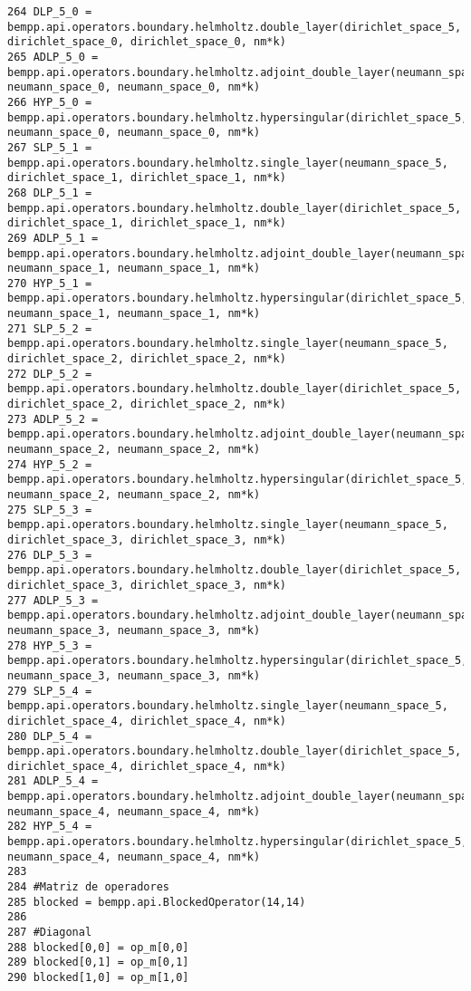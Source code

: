 \documentclass[12pt,letterpaper]{report}
\numberwithin{equation}{section}
\begin{document}
\begin{lstlisting}
264 DLP_5_0 = bempp.api.operators.boundary.helmholtz.double_layer(dirichlet_space_5, dirichlet_space_0, dirichlet_space_0, nm*k)
265 ADLP_5_0 = bempp.api.operators.boundary.helmholtz.adjoint_double_layer(neumann_space_5, neumann_space_0, neumann_space_0, nm*k)
266 HYP_5_0 = bempp.api.operators.boundary.helmholtz.hypersingular(dirichlet_space_5, neumann_space_0, neumann_space_0, nm*k)
267 SLP_5_1 = bempp.api.operators.boundary.helmholtz.single_layer(neumann_space_5, dirichlet_space_1, dirichlet_space_1, nm*k)
268 DLP_5_1 = bempp.api.operators.boundary.helmholtz.double_layer(dirichlet_space_5, dirichlet_space_1, dirichlet_space_1, nm*k)
269 ADLP_5_1 = bempp.api.operators.boundary.helmholtz.adjoint_double_layer(neumann_space_5, neumann_space_1, neumann_space_1, nm*k)
270 HYP_5_1 = bempp.api.operators.boundary.helmholtz.hypersingular(dirichlet_space_5, neumann_space_1, neumann_space_1, nm*k)
271 SLP_5_2 = bempp.api.operators.boundary.helmholtz.single_layer(neumann_space_5, dirichlet_space_2, dirichlet_space_2, nm*k)
272 DLP_5_2 = bempp.api.operators.boundary.helmholtz.double_layer(dirichlet_space_5, dirichlet_space_2, dirichlet_space_2, nm*k)
273 ADLP_5_2 = bempp.api.operators.boundary.helmholtz.adjoint_double_layer(neumann_space_5, neumann_space_2, neumann_space_2, nm*k)
274 HYP_5_2 = bempp.api.operators.boundary.helmholtz.hypersingular(dirichlet_space_5, neumann_space_2, neumann_space_2, nm*k)
275 SLP_5_3 = bempp.api.operators.boundary.helmholtz.single_layer(neumann_space_5, dirichlet_space_3, dirichlet_space_3, nm*k)
276 DLP_5_3 = bempp.api.operators.boundary.helmholtz.double_layer(dirichlet_space_5, dirichlet_space_3, dirichlet_space_3, nm*k)
277 ADLP_5_3 = bempp.api.operators.boundary.helmholtz.adjoint_double_layer(neumann_space_5, neumann_space_3, neumann_space_3, nm*k)
278 HYP_5_3 = bempp.api.operators.boundary.helmholtz.hypersingular(dirichlet_space_5, neumann_space_3, neumann_space_3, nm*k)
279 SLP_5_4 = bempp.api.operators.boundary.helmholtz.single_layer(neumann_space_5, dirichlet_space_4, dirichlet_space_4, nm*k)
280 DLP_5_4 = bempp.api.operators.boundary.helmholtz.double_layer(dirichlet_space_5, dirichlet_space_4, dirichlet_space_4, nm*k)
281 ADLP_5_4 = bempp.api.operators.boundary.helmholtz.adjoint_double_layer(neumann_space_5, neumann_space_4, neumann_space_4, nm*k)
282 HYP_5_4 = bempp.api.operators.boundary.helmholtz.hypersingular(dirichlet_space_5, neumann_space_4, neumann_space_4, nm*k)
283 
284 #Matriz de operadores
285 blocked = bempp.api.BlockedOperator(14,14)
286 
287 #Diagonal
288 blocked[0,0] = op_m[0,0]
289 blocked[0,1] = op_m[0,1]
290 blocked[1,0] = op_m[1,0]

\end{lstlisting}
\end{document}
